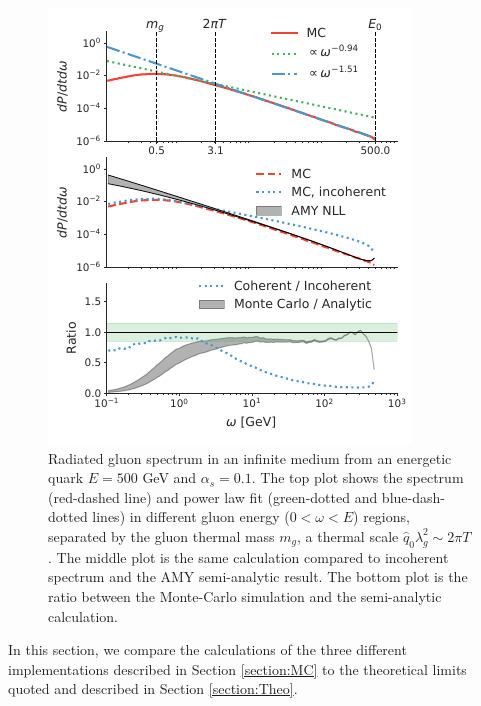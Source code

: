 \documentclass[aps, prc, reprint, amsmath, groupedaddress, nofootinbib]{revtex4-1}
\begin{document}
\begin{figure}
\includegraphics[width=\columnwidth]{spectrum.pdf}
\caption{Radiated gluon spectrum in an infinite medium from an energetic quark $E=500$ GeV and $\alpha_s = 0.1$. The top plot shows the spectrum (red-dashed line) and power law fit (green-dotted and blue-dash-dotted lines) in different gluon energy ($0<\omega < E$) regions, separated by the gluon thermal mass $m_g$, a thermal scale $\hat{q}_0\lambda_g^2 \sim 2\pi T$. The middle plot is the same calculation compared to incoherent spectrum and the AMY semi-analytic result. The bottom plot is the ratio between the Monte-Carlo simulation and the semi-analytic calculation.}
\label{fig:spectrum}
\end{figure}


In this section, we compare the calculations of the three different implementations described in Section \ref{section:MC} to the theoretical limits quoted and described in Section \ref{section:Theo}. 
\end{document}

